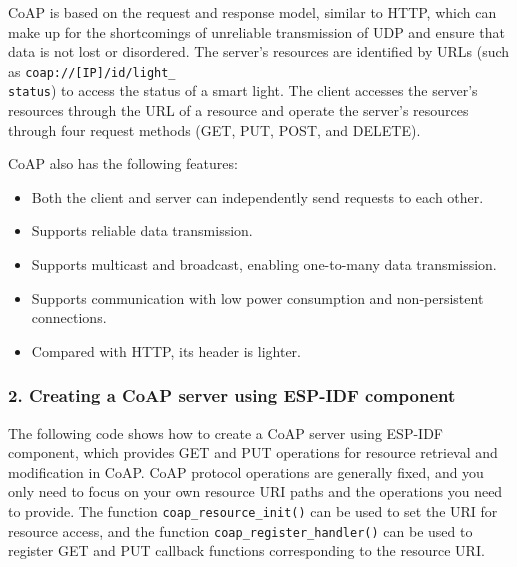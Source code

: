 \documentclass[a4paper,12pt]{book}
\begin{document}
CoAP is based on the request and response model, similar to HTTP, which can make up for the shortcomings of unreliable transmission of UDP and ensure that data is not lost or disordered. The server’s resources are identified by URLs (such as \verb|coap://[IP]/id/light_|\\ \verb|status|) to access the status of a smart light. The client accesses the server’s resources through the URL of a resource and operate the server’s resources through four request methods (GET, PUT, POST, and DELETE).

CoAP also has the following features:

\begin{itemize}[leftmargin=1.5em,noitemsep]
    \item Both the client and server can independently send requests to each other.
    \item Supports reliable data transmission.
    \item Supports multicast and broadcast, enabling one-to-many data transmission.
    \item Supports communication with low power consumption and non-persistent connections.
    \item Compared with HTTP, its header is lighter.
\end{itemize}

\subsubsection{2. Creating a CoAP server using ESP-IDF component}
The following code shows how to create a CoAP server using ESP-IDF component, which provides GET and PUT operations for resource retrieval and modification in CoAP. CoAP protocol operations are generally fixed, and you only need to focus on your own resource URI paths and the operations you need to provide. The function \verb|coap_resource_init()| can be used to set the URI for resource access, and the function \verb|coap_register_handler()| can be used to register GET and PUT callback functions corresponding to the resource URI.

\end{document}
